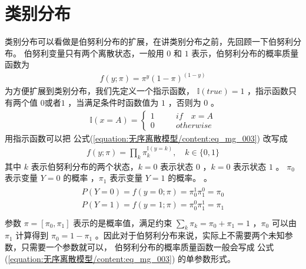 \documentclass[letterpaper,10pt,english]{sphinxmanual}
\begin{document}
\section{类别分布}
\label{\detokenize{_u65e0_u5e8f_u79bb_u6563_u6a21_u578b/content:id2}}
类别分布可以看做是伯努利分布的扩展，在讲类别分布之前，先回顾一下伯努利分布。
伯努利变量只有两个离散状态，一般用 \(0\)
和 \(1\) 表示，伯努利分布的概率质量函数为
\begin{equation}\label{equation:无序离散模型/content:eq_mg_003}
\begin{split}f(y;\pi) = \pi^y (1-\pi)^{(1-y)}\end{split}
\end{equation}
为方便扩展到类别分布，我们先定义一个指示函数， \(\mathbb{I}(true)=1\)
，指示函数只有两个值 \(0 \text{或者} 1\)
，当满足条件时函数值为 \(1\) ，否则为 \(0\)
。
\begin{equation}\label{equation:无序离散模型/content:无序离散模型/content:0}
\begin{split}\mathbb{I}(x=A)=\left\{
\begin{aligned}
1 & \quad &if \quad x = A \\
0 & \quad &otherwise
\end{aligned}
\right.\end{split}
\end{equation}
用指示函数可以把 公式(\ref{equation:无序离散模型/content:eq_mg_003}) 改写成
\begin{equation}\label{equation:无序离散模型/content:无序离散模型/content:1}
\begin{split}f(y;\pi) = \prod_{k} \pi_k^{\mathbb{I}(y=k)}, \quad k \in \{0,1\}\end{split}
\end{equation}
其中 \(k\) 表示伯努利分布的两个状态，\(k=0\) 表示状态 \(0\)
，\(k=0\) 表示状态 \(1\)
。 \(\pi_0\) 表示变量 \(Y=0\) 的概率
，\(\pi_1\) 表示变量 \(Y=1\) 的概率。
。
\begin{align}\label{equation:无序离散模型/content:无序离散模型/content:2}\!\begin{aligned}
P(Y=0) = f(y=0;\pi) = \pi_0^1 \pi_1^0=\pi_0\\
P(Y=1) = f(y=1;\pi) = \pi_0^0 \pi_1^1=\pi_1\\
\end{aligned}\end{align}
参数 \(\pi=[\pi_0,\pi_1]\) 表示的是概率值，满足约束 \(\sum_k \pi_k = \pi_0 + \pi_1 =1\)
，\(\pi_0\) 可以由 \(\pi_1\) 计算得到 \(\pi_0=1-\pi_1\)
。因此对于伯努利分布来说，实际上不需要两个未知参数，只需要一个参数就可以，
伯努利分布的概率质量函数一般会写成 公式(\ref{equation:无序离散模型/content:eq_mg_003}) 的单参数形式。
\end{document}
